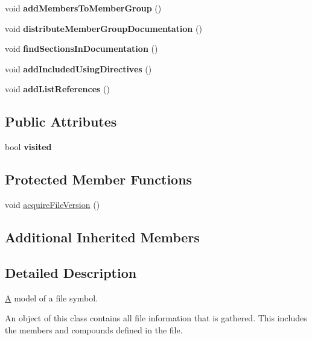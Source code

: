 \begin{DoxyCompactItemize}
void {\bfseries add\+Members\+To\+Member\+Group} ()
\item 
\mbox{\label{class_file_def_a7974ff660e62bc06738fa3098ffac1e8}} 
void {\bfseries distribute\+Member\+Group\+Documentation} ()
\item 
\mbox{\label{class_file_def_a853d5e3b1c9ce164cfd2c5c5b5bff042}} 
void {\bfseries find\+Sections\+In\+Documentation} ()
\item 
\mbox{\label{class_file_def_a364521fb6ffb159910421580992445ba}} 
void {\bfseries add\+Included\+Using\+Directives} ()
\item 
\mbox{\label{class_file_def_a00c1d42689c72a489df756202e6086a7}} 
void {\bfseries add\+List\+References} ()
\end{DoxyCompactItemize}
\subsection*{Public Attributes}
\begin{DoxyCompactItemize}
\item 
\mbox{\label{class_file_def_ad5dd0c1f9f0df9b7f36abf6feea9c1a1}} 
bool {\bfseries visited}
\end{DoxyCompactItemize}
\subsection*{Protected Member Functions}
\begin{DoxyCompactItemize}
\item 
void \mbox{\hyperlink{class_file_def_a5f297c95a2f5b8d2e1a7e3620b4c8d01}{acquire\+File\+Version}} ()
\end{DoxyCompactItemize}
\subsection*{Additional Inherited Members}


\subsection{Detailed Description}
\mbox{\hyperlink{class_a}{A}} model of a file symbol.

An object of this class contains all file information that is gathered. This includes the members and compounds defined in the file.

